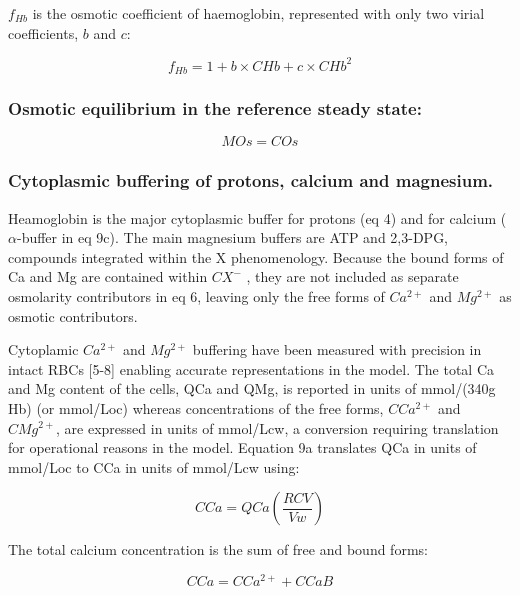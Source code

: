 \documentclass[a4paper]{article}
\newcommand{\med}[1]{M#1}
\newcommand{\cell}[1]{C#1}
\newcommand{\MOs}{\med{Os}}
\newcommand{\CMgtp}{\cell{Mg^{2+}}}
\newcommand{\CCatp}{\cell{Ca^{2+}}}
\newcommand{\CHb}{\cell{Hb}}
\newcommand{\COs}{\cell{Os}}
\newcommand{\CCa}{\cell{Ca}}
\newcommand{\CCaB}{\cell{CaB}}
\newcommand{\QCa}{QCa}
\newcommand{\fHb}{f_{Hb}}
\begin{document}
$\fHb$ is the osmotic coefficient of haemoglobin, represented with only two virial coefficients, $b$ and $c$:

\begin{equation}
\fHb = 1 + b\times\CHb + c\times\CHb^2 
\end{equation}

\subsubsection{Osmotic equilibrium in the reference steady state:}

\begin{equation}
\MOs = \COs
\end{equation}

\subsubsection{Cytoplasmic buffering of protons, calcium and magnesium.}
Heamoglobin is the major cytoplasmic buffer for protons (eq 4) and for calcium ($\alpha$-buffer in eq 9c).  The main magnesium buffers are ATP and 2,3-DPG, compounds integrated within the X  phenomenology.  Because the bound forms of Ca and Mg are contained within $CX^-$ , they are not included as separate osmolarity contributors in eq 6, leaving only the free forms of $Ca^{2+}$ and $Mg^{2+}$ as osmotic contributors.  

Cytoplamic $Ca^{2+}$ and $Mg^{2+}$ buffering have been measured with precision in intact RBCs [5-8] enabling accurate representations in the model.  The total Ca and Mg content of the cells, QCa and QMg, is reported in units of mmol/(340g Hb) (or mmol/Loc) whereas concentrations of the free forms, $\CCatp$ and $\CMgtp$, are expressed in units of mmol/Lcw, a conversion requiring translation for operational reasons in the model. Equation 9a translates QCa in units of mmol/Loc to CCa in units of mmol/Lcw using:


\setcounter{equation}{0}
\renewcommand{\theequation}{9.\alph{equation}}

\begin{equation}
\CCa = \QCa\left(\frac{RCV}{Vw}\right)
\end{equation}
 

The total calcium concentration is the sum of free and bound forms:

\begin{equation}
\CCa = \CCatp + \CCaB
\end{equation}
\end{document}
